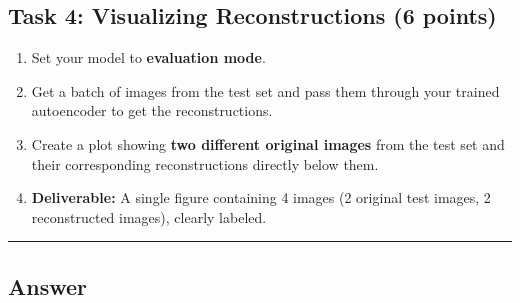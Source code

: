 \documentclass[
  letterpaper,
  DIV=11,
  numbers=noendperiod]{scrartcl}
\providecommand{\tightlist}{%
  \setlength{\itemsep}{0pt}\setlength{\parskip}{0pt}}\usepackage{longtable,booktabs,array}
\begin{document}
\subsection{Task 4: Visualizing Reconstructions (6
points)}\label{task-4-visualizing-reconstructions-6-points}

\begin{enumerate}
\def\labelenumi{\arabic{enumi}.}
\tightlist
\item
  Set your model to \textbf{evaluation mode}.
\item
  Get a batch of images from the test set and pass them through your
  trained autoencoder to get the reconstructions.
\item
  Create a plot showing \textbf{two different original images} from the
  test set and their corresponding reconstructions directly below them.
\item
  \textbf{Deliverable:} A single figure containing 4 images (2 original
  test images, 2 reconstructed images), clearly labeled.
\end{enumerate}

\begin{center}\rule{0.5\linewidth}{0.5pt}\end{center}

\subsection{Answer}\label{answer-11}
\end{document}
